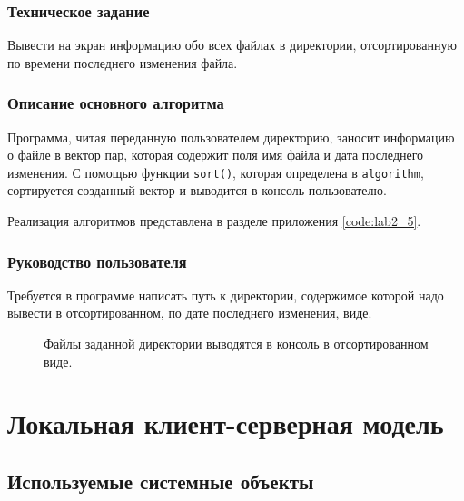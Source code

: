 \documentclass[a4paper,14pt]{extarticle}
\begin{document}
\subsubsection{Техническое задание}
Вывести на экран информацию обо всех файлах в директории, отсортированную по времени последнего изменения файла.

\subsubsection{Описание основного алгоритма}
Программа, читая переданную пользователем директорию, заносит информацию о файле в вектор пар, которая содержит поля имя файла и дата последнего изменения. С помощью функции \verb|sort()|, которая определена в \verb|algorithm|, сортируется созданный вектор и выводится в консоль пользователю.

Реализация алгоритмов представлена в разделе приложения \ref{code:lab2_5}.

\subsubsection{Руководство пользователя}
Требуется в программе написать путь к директории, содержимое которой надо вывести в отсортированном, по дате последнего изменения, виде.

\begin{figure}[h]
\caption{Файлы заданной директории выводятся в консоль в отсортированном виде.}
\label{1.png}
\end{figure}

\newpage

\section{Локальная клиент-серверная модель}
\subsection{Используемые системные объекты}
\end{document}

